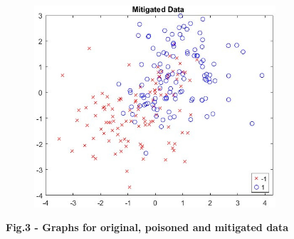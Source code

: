 \begin{figure}[H]
	\centering
	\includegraphics[width=0.8\textwidth]{media/ict2/image228}
	\caption*{}
\end{figure}
{\bfseries Fig.3 - Graphs for original, poisoned and mitigated data}

